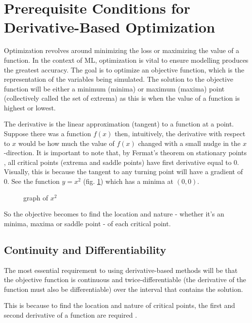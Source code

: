 \documentclass[10pt,a4paper]{report}
\begin{document}
		\section{Prerequisite Conditions for Derivative-Based Optimization}
			Optimization revolves around minimizing the loss or maximizing the value of a function. In the
			context of ML, optimization is vital to ensure modelling produces the greatest accuracy.
			The goal is to optimize an objective function, which is the
			representation of the variables being simulated. The solution to the objective function will be
			either a minimum (minima) or maximum (maxima) point (collectively called the set of extrema) as
			this is when the value of a function is highest or lowest. \par
			The derivative is the linear approximation (tangent) to a function at a point. Suppose there was a
			function $f(x)$ then, intuitively, the derivative with respect to $x$ would be how much the value of $f(x)$
			changed with a small nudge in the $x$-direction. It is important to note that, by Fermat's theorem on stationary points
			\autocite{StationaryPoints}, all critical points (extrema and saddle points) have first derivative equal to 0. Visually, this
			is because the tangent to any turning point will have a gradient of 0. See the function $y = x^2$ (fig. \ref{fig:extrema}) which has a minima at $(0,0)$. \par
			\begin{figure}[h]
				\centering
				\caption{graph of $x^2$}
				\label{fig:extrema}
			\end{figure}
			So the objective becomes to find the location and nature - whether it's an minima, maxima or saddle point - of each critical point.

			\subsection{Continuity and Differentiability}
				The most essential requirement to using derivative-based methods will be that the objective
				function is continuous and twice-differentiable (the derivative of the function must also be differentiable)
				over the interval that contains the solution. \par
				This is because to find the location and nature of critical points, the first and second derivative
				of a function are required \autocite{SecondDerivativeTest}. \par
\end{document}
